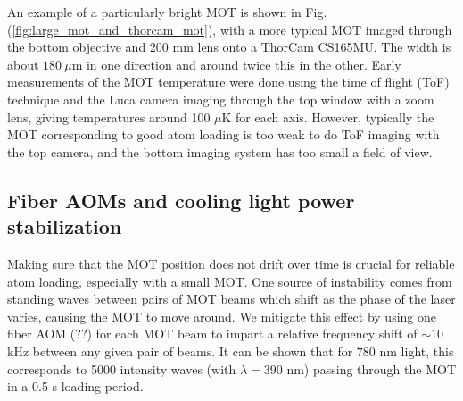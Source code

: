 An example of a particularly bright MOT is shown in Fig. (\ref{fig:large_mot_and_thorcam_mot}), with a more typical MOT imaged through the bottom objective and 200 mm lens onto a ThorCam CS165MU. The width is about $180~\mu$m in one direction and around twice this in the other. Early measurements of the MOT temperature were done using the time of flight (ToF) technique and the Luca camera imaging through the top window with a zoom lens, giving temperatures around 100 $\mu$K for each axis. However, typically the MOT corresponding to good atom loading is too weak to do ToF imaging with the top camera, and the bottom imaging system has too small a field of view.

\subsection{Fiber AOMs and cooling light power stabilization}\label{sec:fiber_AOM_power_stabilization}

Making sure that the MOT position does not drift over time is crucial for reliable atom loading, especially with a small MOT. One source of instability comes from standing waves between pairs of MOT beams which shift as the phase of the laser varies, causing the MOT to move around. We mitigate this effect by using one fiber AOM (??) for each MOT beam to impart a relative frequency shift of $\sim 10$kHz between any given pair of beams. It can be shown that for $780$ nm light, this corresponds to 5000 intensity waves (with $\lambda=390$ nm) passing through the MOT in a 0.5 s loading period. 


